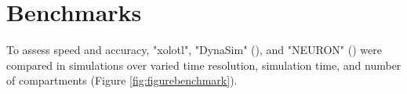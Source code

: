 \documentclass{frontiersSCNS} %
\begin{document}
%
%
%
%
%

%
%
%
%
%
%

\section{Benchmarks}
\label{benchmarks}

To assess speed and accuracy, "xolotl", "DynaSim" (\cite{sherfeyDynaSimMATLABToolbox2018}), and "NEURON" (\cite{hinesNEURONSimulationEnvironment1997}) were compared in simulations over varied time resolution,  simulation time, and number of compartments (Figure \ref{fig:figurebenchmark}).
\end{document}
